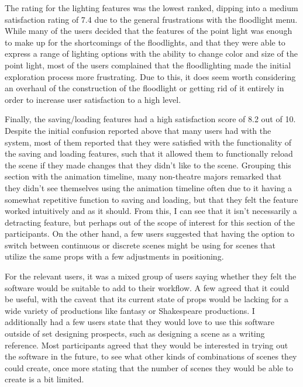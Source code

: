 \documentclass[10pt,twocolumn]{article}
\begin{document}
The rating for the lighting features was the lowest ranked, dipping into a medium satisfaction rating of 7.4 due to the general frustrations with the floodlight menu. While many of the users decided that the features of the point light was enough to make up for the shortcomings of the floodlights, and that they were able to express a range of lighting options with the ability to change color and size of the point light, most of the users complained that the floodlighting made the initial exploration process more frustrating. Due to this, it does seem worth considering an overhaul of the construction of the floodlight or getting rid of it entirely in order to increase user satisfaction to a high level.

Finally, the saving/loading features had a high satisfaction score of 8.2 out of 10. Despite the initial confusion reported above that many users had with the system, most of them reported that they were satisfied with the functionality of the saving and loading features, such that it allowed them to functionally reload the scene if they made changes that they didn't like to the scene. Grouping this section with the animation timeline, many non-theatre majors remarked that they didn't see themselves using the animation timeline often due to it having a somewhat repetitive function to saving and loading, but that they felt the feature worked intuitively and as it should. From this, I can see that it isn't necessarily a detracting feature, but perhaps out of the scope of interest for this section of the participants. On the other hand, a few users suggested that having the option to switch between continuous or discrete scenes might be using for scenes that utilize the same props with a few adjustments in positioning. 

For the relevant users, it was a mixed group of users saying whether they felt the software would be suitable to add to their workflow. A few agreed that it could be useful, with the caveat that its current state of props would be lacking for a wide variety of productions like fantasy or Shakespeare productions. I additionally had a few users state that they would love to use this software outside of set designing prospects, such as designing a scene as a writing reference. Most participants agreed that they would be interested in trying out the software in the future, to see what other kinds of combinations of scenes they could create, once more stating that the number of scenes they would be able to create is a bit limited. 
\end{document}
